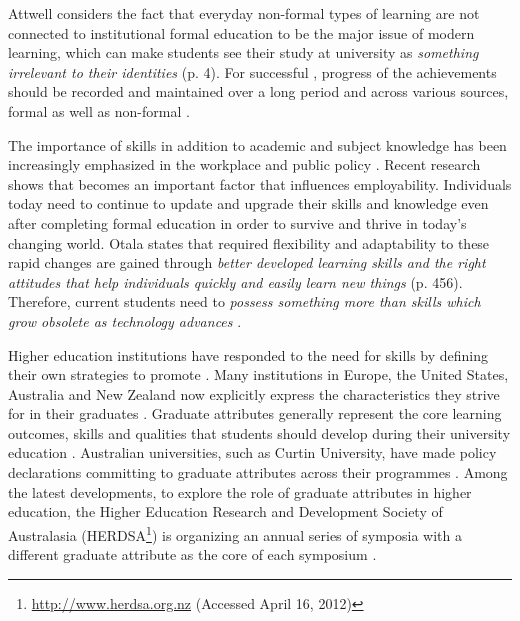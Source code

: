 Attwell \citeyearpar{Attwell2007} considers the fact that everyday non-formal
types of learning are not connected to institutional formal education to be the
major issue of modern learning, which can make students see their study at
university as \textit{something irrelevant to their identities} (p. 4). For
successful \LLLsn, progress of the achievements should be recorded and
maintained over a long period and across various sources, formal as well as
non-formal \citep{Kay2008}.


The importance of \LLLs skills in addition to academic and subject knowledge has
been increasingly emphasized in the workplace and public policy
\citep{Morgan-Klein2007,Sutherland2006}. Recent research
\citep{Simmons-McDonald2009} shows that \LLLs becomes an important factor that
influences employability. Individuals today need to continue to update and
upgrade their skills and knowledge even after completing formal education in
order to survive and thrive in today's changing world. Otala
\citeyearpar{Otala1997} states that required flexibility and adaptability to
these rapid changes are gained through \textit{better developed learning skills
and the right attitudes that help individuals quickly and easily learn new
things} (p. 456). Therefore, current students need to \textit{possess something
more than skills which grow obsolete as technology advances}
\cite[p.~195]{Field2003}.

Higher education institutions have responded to the need for \LLLs skills by
defining their own strategies to promote \LLLsn. Many institutions in Europe,
the United States, Australia and New Zealand now explicitly express the \LLLs
characteristics they strive for in their graduates \citep{Scanlon2006}. Graduate
attributes generally represent the core learning outcomes, skills and qualities
that students should develop during their university education
\citep{Hughes2010}. Australian universities, such as Curtin University, have
made policy declarations committing to graduate attributes across their
programmes \citep{CurtinUniversity2006}. Among the latest developments, to
explore the role of graduate attributes in higher education, the Higher
Education Research and Development Society of Australasia
(HERDSA\footnote{\url{http://www.herdsa.org.nz} (Accessed April 16, 2012)}) is
organizing an annual series of symposia with a different graduate attribute as the core of each symposium
\citep{HERDSA2012}.


